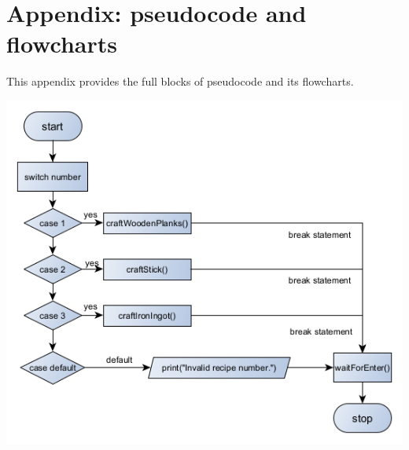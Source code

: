 \section{Appendix: pseudocode and flowcharts} \label{section: appendix}
This appendix provides the full blocks of pseudocode and its flowcharts.

{\includegraphics[width=\textwidth]{../flowchart/craftItem_-_Flowchart.png}}